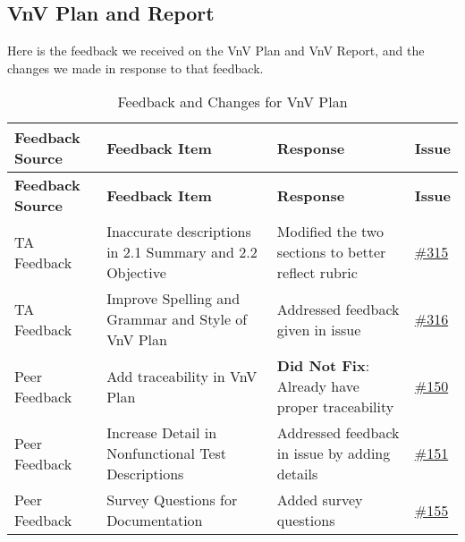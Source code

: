 \documentclass{article}
\begin{document}
\subsection{VnV Plan and Report}

Here is the feedback we received on the VnV Plan and VnV Report, and the changes we made in response to that feedback.
\begin{longtable}{| p{} | p{} | p{} | p{} |}
    \caption{Feedback and Changes for VnV Plan} \\
    \hline
    \textbf{Feedback Source} & \textbf{Feedback Item} & \textbf{Response} & \textbf{Issue} \\
    \hline
    \endfirsthead
    \hline
    \textbf{Feedback Source} & \textbf{Feedback Item} & \textbf{Response} & \textbf{Issue} \\
    \hline
    \endhead
    \hline
    \endfoot
    TA Feedback & Inaccurate descriptions in 2.1 Summary and 2.2 Objective  & Modified the two sections to better reflect rubric & \href{https://github.com/TPGEngine/tpg/issues/315}{\#315} \\
    \hline
    TA Feedback & Improve Spelling and Grammar and Style of VnV Plan  & Addressed feedback given in issue & \href{https://github.com/TPGEngine/tpg/issues/316}{\#316} \\
    \hline
    Peer Feedback & Add traceability in VnV Plan & \textbf{Did Not Fix}: Already have proper traceability & \href{https://github.com/TPGEngine/tpg/issues/150}{\#150} \\
    \hline
    Peer Feedback & Increase Detail in Nonfunctional Test Descriptions & Addressed feedback in issue by adding details & \href{https://github.com/TPGEngine/tpg/issues/151}{\#151} \\
    \hline
     Peer Feedback & Survey Questions for Documentation & Added survey questions & \href{https://github.com/TPGEngine/tpg/issues/155}{\#155} \\
    \hline


\end{longtable}
\end{document}
